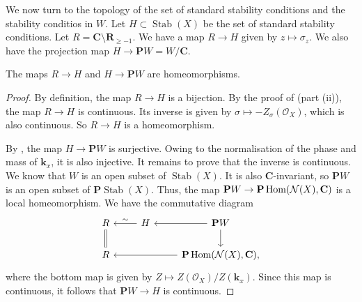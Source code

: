 \documentclass{amsart}
\begin{document}
We now turn to the topology of the set of standard stability conditions and the stability conditios in \(W\).
Let \(H \subset \operatorname{Stab}(X)\) be the set of standard stability conditions.
Let \(R = \mathbf{C} \setminus \mathbf{R}_{\geq -1}\).
We have a map \(R \to H\) given by \(z \mapsto \sigma_z\).
We also have the projection map \(H \to \mathbf{P}W = W/ \mathbf{C}\).
\begin{proposition}\label{prop:chart}
 The maps \(R \to H\) and \(H \to \mathbf{P} W\) are homeomorphisms.
\end{proposition}
\begin{proof}
  By definition, the map \(R \to H\) is a bijection.
  By the proof of \cite[Theorem~4.8]{huy.mac.ste:08} (part (ii)), the map \(R \to H\) is continuous.
  Its inverse is given by \(\sigma \mapsto -Z_{\sigma}(\mathcal{O}_{X})\), which is also continuous.
  So \(R \to H\) is a homeomorphism.

  By , the map \(H \to \mathbf{P} W\) is surjective.
  Owing to the normalisation of the phase and mass of \(\mathbf{k}_x\), it is also injective.
  It remains to prove that the inverse is continuous.
  We know that \(W\) is an open subset of \(\operatorname{Stab}(X)\).
  It is also \(\mathbf{C}\)-invariant, so \(\mathbf{P} W\) is an open subset of \(\mathbf{P} \operatorname{Stab}(X)\).
  Thus, the map \(\mathbf{P} W \to \mathbf{P} \operatorname{Hom}(\mathcal{N}(X), \mathbf{C})\) is a local homeomorphism.
  We have the commutative diagram
  \[
    \begin{tikzcd}
      R\ar[equal]{d} & H \ar{l}[above]{\sim} & \mathbf{P} W\ar{l}\ar{d} \\
      R & & \mathbf{P} \Hom(\mathcal{N}(X), \mathbf{C})\ar{ll},
    \end{tikzcd}
  \]
  where the bottom map is given by \(Z \mapsto  Z(\mathcal{O}_X)/Z(\mathbf{k}_x)\).
  Since this map is continuous, it follows that \(\mathbf{P} W \to H\) is continuous.
\end{proof}
\end{document}
